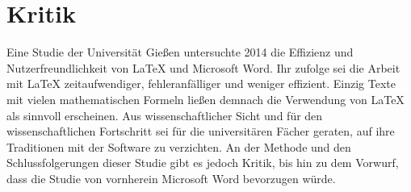 
\section{Kritik}

Eine Studie der Universität Gießen untersuchte 2014 die Effizienz und Nutzerfreundlichkeit von LaTeX und Microsoft Word. Ihr zufolge sei die Arbeit mit LaTeX zeitaufwendiger, fehleranfälliger und weniger effizient.\cite{Knauff} Einzig Texte mit vielen mathematischen Formeln ließen demnach die Verwendung von LaTeX als sinnvoll erscheinen. Aus wissenschaftlicher Sicht und für den wissenschaftlichen Fortschritt sei für die universitären Fächer geraten, auf ihre Traditionen mit der Software zu verzichten. An der Methode und den Schlussfolgerungen dieser Studie gibt es jedoch Kritik, bis hin zu dem Vorwurf, dass die Studie von vornherein Microsoft Word bevorzugen würde.\cite{nature}